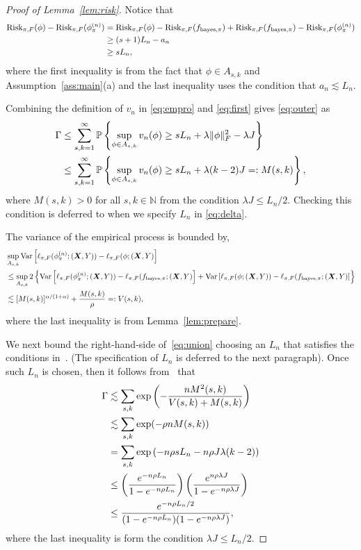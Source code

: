\documentclass[11pt]{article}
\theoremstyle{plain}
\theoremstyle{definition}
\def\bayespif{f_{\textup{bayes},\pi}}
\def\riskF{\textup{Risk}_{\pi,F}}
\begin{document}
\begin{proof}[Proof of Lemma~\ref{lem:risk}]
Notice that 
\begin{align}\label{eq:first}
\riskF(\phi)-\riskF(\phi_\pi^{(n)}) &= \riskF(\phi)-\riskF(\bayespif)+\riskF(\bayespif)-\riskF(\phi_\pi^{(n)})\nonumber\\&\geq (s+1)L_n -a_n\nonumber
\\&\geq  sL_n,
\end{align}
where the first inequality is from the fact that $\phi\in A_{s,k}$ and Assumption~\ref{ass:main}(a) and the last inequality uses the condition that $a_n\lesssim L_n$.

Combining the definition of $v_n$ in \eqref{eq:empro} and \eqref{eq:first} gives \eqref{eq:outer} as
\begin{align}\label{eq:union}
\Gamma&\leq \sum_{s,k=1}^\infty\mathbb{P}\left\{\sup_{\phi\in A_{s,k}}  v_n(\phi)\geq sL_n + \lambda\lVert\phi\rVert_F^2-\lambda J\right\}\nonumber\\&\leq \sum_{s,k=1}^\infty\mathbb{P}\left\{\sup_{\phi\in A_{s,k}}  v_n(\phi)\geq sL_n + \lambda(k-2) J=: M(s,k)\right\},
\end{align}
where  $M(s,k)>0$ for all $s,k\in\mathbb{N}$ from the condition $\lambda J\leq L_n/2$.  Checking this condition is deferred to when we specify $L_n$ in \eqref{eq:delta}. 

The variance of the empirical process is bounded by,
\begin{align}\label{eq:second}
&\sup_{A_{s,k}}\textup{Var}\left[\ell_{\pi,F}(\phi_\pi^{(n)};(\mX,Y))-\ell_{\pi,F}(\phi;(\mX,Y)\right]\\&\leq\sup_{A_{s,k}}2\left\{ \textup{Var}\left[\ell_{\pi,F}(\phi_\pi^{(n)};(\mX,Y))-\ell_{\pi,F}(\bayespif;(\mX,Y)\right]+\textup{Var}\left[\ell_{\pi,F}(\phi;(\mX,Y))-\ell_{\pi,F}(\bayespif;(\mX,Y)\right]\right\}\notag \\
&\lesssim [M(s,k)]^{\alpha/(1+\alpha)}+{M(s,k)\over \rho}=:V(s,k),
\end{align}
where the last inequality is from Lemma~\ref{lem:prepare}.


We next bound the right-hand-side of~\eqref{eq:union} choosing an $L_n$ that satisfies the conditions in~\citet[Theorem 3]{shen1994convergence}. (The specification of $L_n$ is deferred to the next paragraph). Once such $L_n$ is chosen, then it follows from~\citet[Theorem 3]{shen1994convergence} that
\begin{align}\label{eq:gamma}
\Gamma& \lesssim \sum_{s,k}\exp\left( - {nM^2(s,k)\over V(s,k)+M(s,k)}\right)\notag \\
&\lesssim \sum_{s,k}\exp(-\rho nM(s,k)) \notag\\
&= \sum_{s,k}\exp\left(-n\rho sL_n-n\rho J \lambda(k-2)\right)\notag\\
&\leq \left({e^{-n\rho L_n}\over 1-e^{-n\rho L_n} }\right) \left({e^{n\rho \lambda J} \over 1-e^{-n\rho \lambda J}}\right)\\&\leq {e^{-n\rho L_n/2}\over (1-e^{-n\rho L_n})(1-e^{-n\rho\lambda J})},
\end{align}
where the last inequality is form the condition $\lambda J\leq L_n/2$.



\end{proof}
\end{document}
